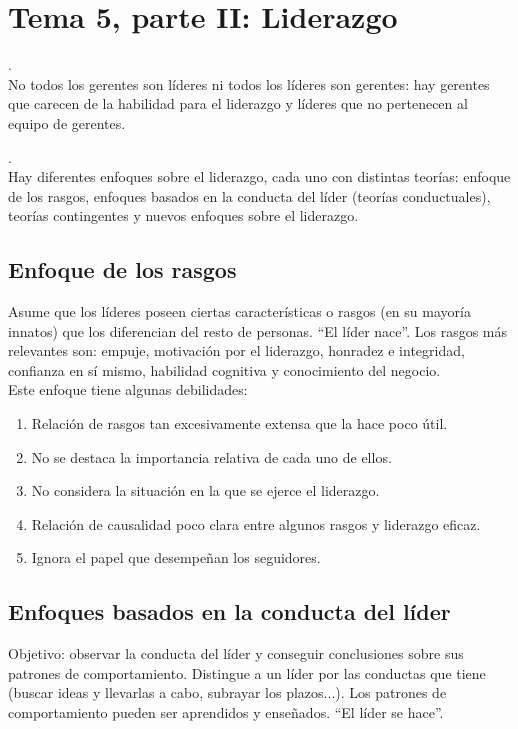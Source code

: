 \documentclass[12pt]{article}
\theoremstyle{definition_wo_parentheses}
\begin{document}
\section{Tema 5, parte II: Liderazgo}
.\\

No todos los gerentes son líderes ni todos los líderes son gerentes: hay gerentes que carecen de la habilidad para el liderazgo y líderes que no pertenecen al equipo de gerentes.

.\\

Hay diferentes enfoques sobre el liderazgo, cada uno con distintas teorías: enfoque de los rasgos, enfoques basados en la conducta del líder (teorías conductuales), teorías contingentes y nuevos enfoques sobre el liderazgo.

\subsection{Enfoque de los rasgos}
Asume que los líderes poseen ciertas características o rasgos (en su mayoría innatos) que los diferencian del resto de personas. ``El líder nace''. Los rasgos más relevantes son: empuje, motivación por el liderazgo, honradez e integridad, confianza en sí mismo, habilidad cognitiva y conocimiento del negocio.\\
Este enfoque tiene algunas debilidades:
\begin{enumerate}
\item Relación de rasgos tan excesivamente extensa que la hace poco útil.
\item No se destaca la importancia relativa de cada uno de ellos.
\item No considera la situación en la que se ejerce el liderazgo.
\item Relación de causalidad poco clara entre algunos rasgos y liderazgo eficaz.
\item Ignora el papel que desempeñan los seguidores.
\end{enumerate}

\subsection{Enfoques basados en la conducta del líder}
Objetivo: observar la conducta del líder y conseguir conclusiones sobre sus patrones de comportamiento. Distingue a un líder por las conductas que tiene (buscar ideas y llevarlas a cabo, subrayar los plazos...). Los patrones de comportamiento pueden ser aprendidos y enseñados. ``El líder se hace''.
\end{document}
